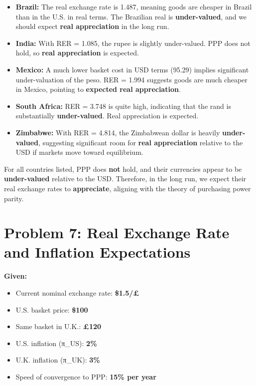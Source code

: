 \documentclass[
]{article}
\begin{document}
\begin{itemize}
\item
  \textbf{Brazil:} The real exchange rate is 1.487, meaning goods are
  cheaper in Brazil than in the U.S. in real terms. The Brazilian real
  is \textbf{under-valued}, and we should expect \textbf{real
  appreciation} in the long run.
\item
  \textbf{India:} With RER = 1.085, the rupee is slightly under-valued.
  PPP does not hold, so \textbf{real appreciation} is expected.
\item
  \textbf{Mexico:} A much lower basket cost in USD terms (95.29) implies
  significant under-valuation of the peso. RER = 1.994 suggests goods
  are much cheaper in Mexico, pointing to \textbf{expected real
  appreciation}.
\item
  \textbf{South Africa:} RER = 3.748 is quite high, indicating that the
  rand is substantially \textbf{under-valued}. Real appreciation is
  expected.
\item
  \textbf{Zimbabwe:} With RER = 4.814, the Zimbabwean dollar is heavily
  \textbf{under-valued}, suggesting significant room for \textbf{real
  appreciation} relative to the USD if markets move toward equilibrium.
\end{itemize}

For all countries listed, PPP does \textbf{not} hold, and their
currencies appear to be \textbf{under-valued} relative to the USD.
Therefore, in the long run, we expect their real exchange rates to
\textbf{appreciate}, aligning with the theory of purchasing power
parity.

\section{Problem 7: Real Exchange Rate and Inflation
Expectations}\label{problem-7-real-exchange-rate-and-inflation-expectations}

\textbf{Given:}

\begin{itemize}
\item
  Current nominal exchange rate: \textbf{\$1.5/£}
\item
  U.S. basket price: \textbf{\$100}
\item
  Same basket in U.K.: \textbf{£120}
\item
  U.S. inflation (π\_US): \textbf{2\%}
\item
  U.K. inflation (π\_UK): \textbf{3\%}
\item
  Speed of convergence to PPP: \textbf{15\% per year}
\end{itemize}
\end{document}
